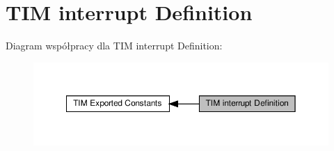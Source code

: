 \hypertarget{group___t_i_m___interrupt__definition}{}\section{T\+IM interrupt Definition}
\label{group___t_i_m___interrupt__definition}
Diagram współpracy dla T\+IM interrupt Definition\+:\nopagebreak
\begin{figure}[H]
\begin{center}
\leavevmode
\includegraphics[width=350pt]{group___t_i_m___interrupt__definition}
\end{center}
\end{figure}
